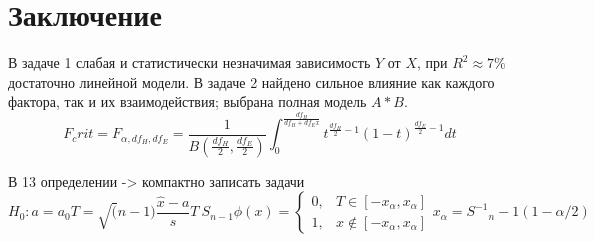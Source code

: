 \documentclass[areasetadvanced]{scrartcl}
\begin{document}
\newpage
\section*{Заключение}
В задаче 1 слабая и статистически незначимая зависимость $Y$ от $X$,
при $R^2\approx7\%$ достаточно линейной модели.  
В задаче 2 найдено сильное влияние как каждого фактора, так и их
взаимодействия; выбрана полная модель $A*B$.
\[ F_crit = F_{\alpha, df_H, df_E} = \frac{1}{B(\frac{df_H}{2}, \frac{df_E}{2})} \int_{0}^{\frac{df_H}{df_H + df_E x}} t^{\frac{df_H}{2}-1} (1-t)^{\frac{df_E}{2}-1} dt \]


В 13 определении -> компактно записать задачи 
\[ 
H_0: a=a_0
T = \sqrt(n-1) \frac{\hat{x}-a}{s}
T~S_{n-1}
\phi(x) = \begin{cases}
  0, & T \in [-x_\alpha, x_\alpha] \\
  1, & x \notin [-x_\alpha, x_\alpha]
  \end{cases}
x_\alpha = {S^{-1}}_n-1 (1-\alpha/2)
\]
\end{document}
